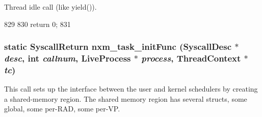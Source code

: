 Thread idle call (like yield()). 


\begin{DoxyCode}
829     {
830         return 0;
831     }
\end{DoxyCode}
\hypertarget{classTru64_a7393c42ceaadfe69e71c4cab0d059968}{
\subsubsection[{nxm\_\-task\_\-initFunc}]{\setlength{\rightskip}{0pt plus 5cm}static {\bf SyscallReturn} nxm\_\-task\_\-initFunc ({\bf SyscallDesc} $\ast$ {\em desc}, \/  int {\em callnum}, \/  {\bf LiveProcess} $\ast$ {\em process}, \/  {\bf ThreadContext} $\ast$ {\em tc})}}
\label{classTru64_a7393c42ceaadfe69e71c4cab0d059968}
This call sets up the interface between the user and kernel schedulers by creating a shared-\/memory region. The shared memory region has several structs, some global, some per-\/RAD, some per-\/VP. 


